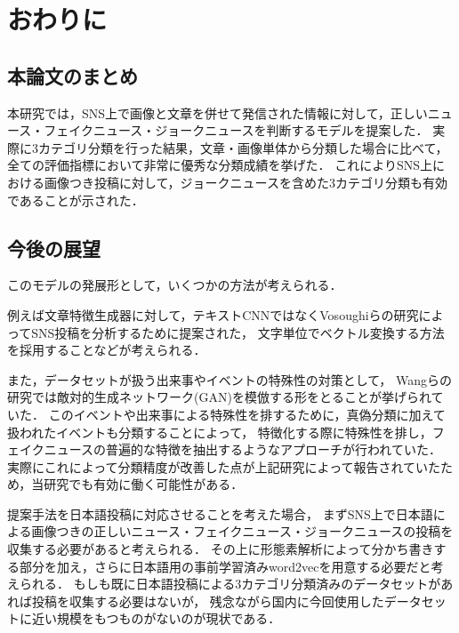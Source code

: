 %
\chapter{おわりに}
%
\section{本論文のまとめ}
本研究では，SNS上で画像と文章を併せて発信された情報に対して，正しいニュース・フェイクニュース・ジョークニュースを判断するモデルを提案した．
実際に3カテゴリ分類を行った結果，文章・画像単体から分類した場合に比べて，全ての評価指標において非常に優秀な分類成績を挙げた．
これによりSNS上における画像つき投稿に対して，ジョークニュースを含めた3カテゴリ分類も有効であることが示された．
%
\section{今後の展望}
このモデルの発展形として，いくつかの方法が考えられる．

例えば文章特徴生成器に対して，テキストCNNではなくVosoughiらの研究\cite{Vosoughi:2016:TLT:2911451.2914762}によってSNS投稿を分析するために提案された，
文字単位でベクトル変換する方法を採用することなどが考えられる．

また，データセットが扱う出来事やイベントの特殊性の対策として，
Wangらの研究\cite{wang2018eann}では敵対的生成ネットワーク(GAN)を模倣する形をとることが挙げられていた．
このイベントや出来事による特殊性を排するために，真偽分類に加えて扱われたイベントも分類することによって，
特徴化する際に特殊性を排し，フェイクニュースの普遍的な特徴を抽出するようなアプローチが行われていた．
実際にこれによって分類精度が改善した点が上記研究によって報告されていたため，当研究でも有効に働く可能性がある．

提案手法を日本語投稿に対応させることを考えた場合，
まずSNS上で日本語による画像つきの正しいニュース・フェイクニュース・ジョークニュースの投稿を収集する必要があると考えられる．
その上に形態素解析によって分かち書きする部分を加え，さらに日本語用の事前学習済みword2vecを用意する必要だと考えられる．
もしも既に日本語投稿による3カテゴリ分類済みのデータセットがあれば投稿を収集する必要はないが，
残念ながら国内に今回使用したデータセットに近い規模をもつものがないのが現状である．

% 
